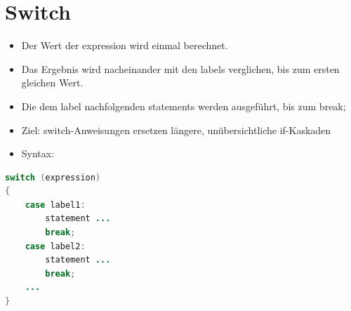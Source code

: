  \section{Switch}
 \begin{itemize}
 \item Der Wert der expression wird einmal berechnet.
\item Das Ergebnis wird nacheinander mit den labels verglichen, bis zum ersten gleichen Wert.
\item  Die dem label nachfolgenden statements werden ausgeführt, bis zum break;
\item Ziel: switch-Anweisungen ersetzen längere, unübersichtliche if-Kaskaden
\item  Syntax:
\end{itemize}
 \begin{lstlisting}[language=JAVA]
switch (expression)
{
	case label1:
		statement ...
		break;
	case label2:
		statement ...
		break;
	...
}
 \end{lstlisting}
